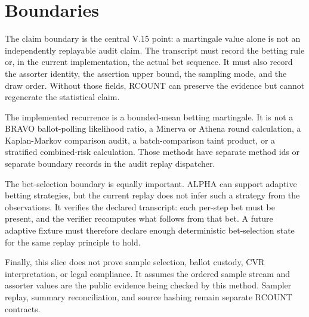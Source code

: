 \section{Boundaries}

The claim boundary is the central V.15 point: a martingale value alone is not an
independently replayable audit claim. The transcript must record the betting
rule or, in the current implementation, the actual bet sequence. It must also
record the assorter identity, the assertion upper bound, the sampling mode, and
the draw order. Without those fields, RCOUNT can preserve the evidence but
cannot regenerate the statistical claim.

The implemented recurrence is a bounded-mean betting martingale. It is not a
BRAVO ballot-polling likelihood ratio, a Minerva or Athena round calculation, a
Kaplan-Markov comparison audit, a batch-comparison taint product, or a
stratified combined-risk calculation. Those methods have separate method ids or
separate boundary records in the audit replay dispatcher.

The bet-selection boundary is equally important. ALPHA can support adaptive
betting strategies, but the current replay does not infer such a strategy from
the observations. It verifies the declared transcript: each per-step bet must
be present, and the verifier recomputes what follows from that bet. A future
adaptive fixture must therefore declare enough deterministic bet-selection state
for the same replay principle to hold.

Finally, this slice does not prove sample selection, ballot custody, CVR
interpretation, or legal compliance. It assumes the ordered sample stream and
assorter values are the public evidence being checked by this method. Sampler
replay, summary reconciliation, and source hashing remain separate RCOUNT
contracts.
